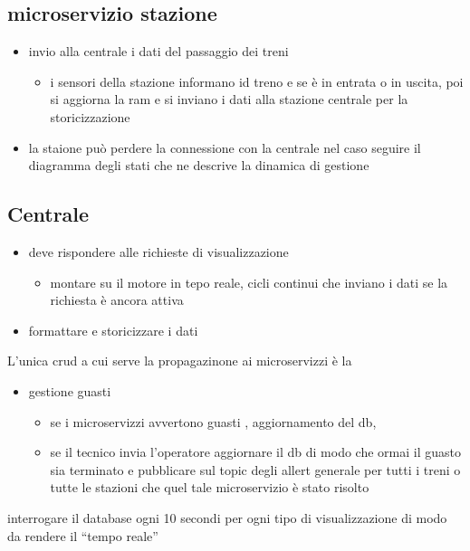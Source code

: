 \documentclass[11pt]{article}
\begin{document}
\subsection{microservizio stazione}
\label{sec:org2a653f4}
\begin{itemize}
\item invio alla centrale i dati del passaggio dei treni
\begin{itemize}
\item i sensori della stazione informano id treno e se è in entrata o in uscita,
poi si aggiorna la ram e si inviano i dati alla stazione centrale per la storicizzazione
\end{itemize}
\item la staione può perdere la connessione
 con la centrale nel caso seguire il diagramma degli stati che ne
descrive la dinamica di gestione
\end{itemize}
\subsection{Centrale}
\label{sec:orgbe1b31b}
\begin{itemize}
\item deve rispondere alle richieste di visualizzazione
\begin{itemize}
\item montare su il motore in tepo reale, cicli continui che inviano i dati se la richiesta è ancora attiva
\end{itemize}
\item formattare e storicizzare i dati
\end{itemize}
L'unica crud a cui serve la propagazinone ai microservizzi è la
\begin{itemize}
\item gestione guasti
\begin{itemize}
\item se i microservizzi avvertono guasti , aggiornamento del db,
\item se il tecnico invia l'operatore aggiornare il db di modo che ormai il guasto sia terminato e
pubblicare sul topic degli allert generale per tutti i treni o tutte le stazioni che quel tale microservizio è stato risolto
\end{itemize}
\end{itemize}
interrogare il database ogni 10 secondi per ogni tipo di visualizzazione di modo da rendere il ``tempo reale''
\end{document}
